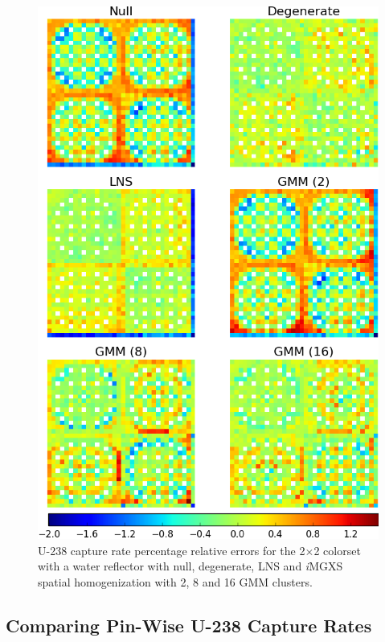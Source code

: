 \documentclass[12pt,twoside]{mitthesis-exec}
\begin{document}
\begin{figure}[h!]
\centering
\includegraphics[width=0.8\linewidth]{figures/results/spatial/reflector/capt-err}
\vspace{2mm}
\caption[U-238 capture rate errors for the 2$\times$2 colorset with reflector]{U-238 capture rate percentage relative errors for the 2$\times$2 colorset with a water reflector with null, degenerate, LNS and \textit{i}MGXS spatial homogenization with 2, 8 and 16 GMM clusters.}
\label{fig:refl-capt-err}
\end{figure}

\clearpage

\subsection*{Comparing Pin-Wise U-238 Capture Rates}
\end{document}
